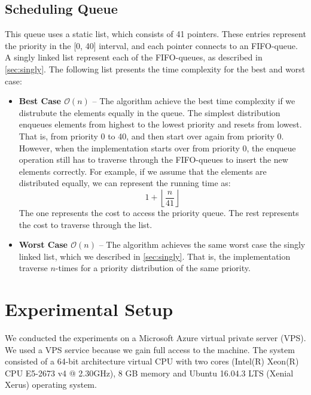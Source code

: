 \documentclass[a4paper,11pt]{kth-mag}
\newcommand\floor[1]{\lfloor#1\rfloor}
\begin{document}
\subsection{Scheduling Queue}
This queue uses a static list, which consists of 41 pointers.
These entries represent the priority in the [0, 40] interval, and each pointer connects to an FIFO-queue.
A singly linked list represent each of the FIFO-queues, as described in \cref{sec:singly}.
The following list presents the time complexity for the best and worst case:
\begin{itemize}
    \item \textbf{Best Case $\mathcal{O}(n)$} -- The algorithm achieve the best time complexity if we distrubute the elements equally in the queue.
        The simplest distribution enqueues elements from highest to the lowest priority and resets from lowest.
        That is, from priority 0 to 40, and then start over again from priority 0.
        However, when the implementation starts over from priority 0, the enqueue operation still has to traverse through the FIFO-queues to insert the new elements correctly.
        For example, if we assume that the elements are distributed equally, we can represent the running time as:
        \begin{equation*}
            1 + \left\floor{\frac{n}{41}\right}
        \end{equation*}
        The one represents the cost to access the priority queue.
        The rest represents the cost to traverse through the list.
    \item \textbf{Worst Case $\mathcal{O}(n)$} -- The algorithm achieves the same worst case the singly linked list, which we described in \cref{sec:singly}.
        That is, the implementation traverse $n$-times for a priority distribution of the same priority.
\end{itemize}



\section{Experimental Setup}
We conducted the experiments on a Microsoft Azure virtual private server (VPS).
We used a VPS service because we gain full access to the machine.
The system consisted of a 64-bit architecture virtual CPU with two cores (Intel(R) Xeon(R) CPU E5-2673 v4 @ 2.30GHz), 8 GB memory and Ubuntu 16.04.3 LTS (Xenial Xerus) operating system.
\end{document}
